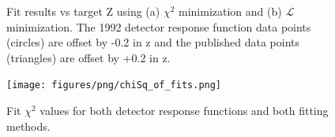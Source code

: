 \begin{figure}[h]
  \centering
  \hfill
  \caption{Fit results vs target Z using (a) $\chi^2$ minimization and (b) $\mathcal{L}$ minimization.
    The 1992 detector response function data points (circles) are offset by -0.2 in z and the published data points (triangles)
    are offset by +0.2 in z.
  }
\end{figure}


\begin{figure}[h]
  \centering
  \texttt{[image: figures/png/chiSq\_of\_fits.png]}
  \caption{Fit $\chi^2$ values for both detector response functions and both fitting methods. }
  \label{fig:ChiSqOfFits}
\end{figure}



